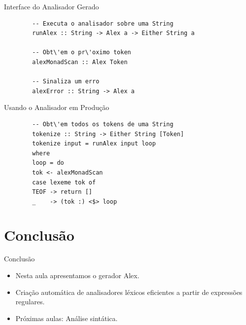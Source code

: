 \begin{frame}[fragile]{Interface do Analisador Gerado}

    \begin{lstlisting}
        -- Executa o analisador sobre uma String
        runAlex :: String -> Alex a -> Either String a

        -- Obt\'em o pr\'oximo token
        alexMonadScan :: Alex Token

        -- Sinaliza um erro
        alexError :: String -> Alex a
    \end{lstlisting}
\end{frame}

\begin{frame}[fragile]{Usando o Analisador em Produção}

    \begin{lstlisting}
        -- Obt\'em todos os tokens de uma String
        tokenize :: String -> Either String [Token]
        tokenize input = runAlex input loop
        where
        loop = do
        tok <- alexMonadScan
        case lexeme tok of
        TEOF -> return []
        _    -> (tok :) <$> loop
    \end{lstlisting}
\end{frame}


\section{Conclusão}\label{conclusuxe3o}

\begin{frame}{Conclusão}

    \begin{itemize}
        \item
        Nesta aula apresentamos o gerador Alex.
        \item
        Criação automática de analisadores léxicos eficientes a partir de
        expressões regulares.
        \item
        Próximas aulas: Análise sintática.
    \end{itemize}
\end{frame}
